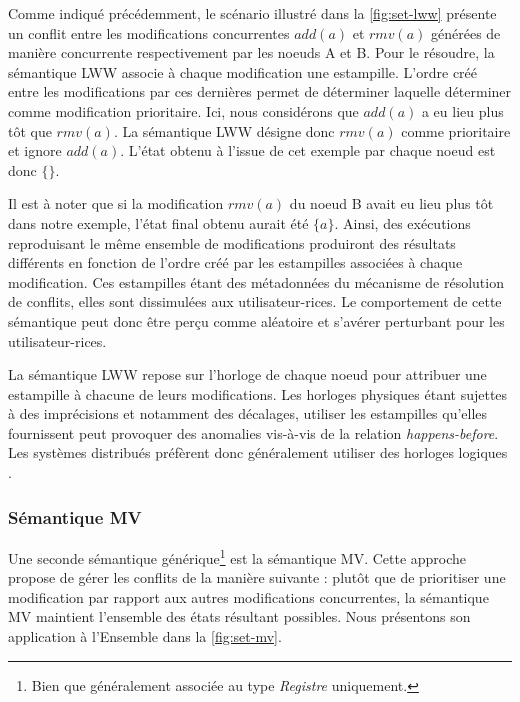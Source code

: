 \documentclass[12pt]{thesul}
\newcommand{\hb}{\emph{happens-before}}
\newcommand{\trm}[1]{\mathit{#1}}
\begin{document}
Comme indiqué précédemment, le scénario illustré dans la \autoref{fig:set-lww} présente un conflit entre les modifications concurrentes $\trm{add}(a)$ et $\trm{rmv}(a)$ générées de manière concurrente respectivement par les noeuds A et B.
Pour le résoudre, la sémantique \ac{LWW} associe à chaque modification une estampille.
L'ordre créé entre les modifications par ces dernières permet de déterminer laquelle déterminer comme modification prioritaire.
Ici, nous considérons que $\trm{add}(a)$ a eu lieu plus tôt que $\trm{rmv}(a)$.
La sémantique \ac{LWW} désigne donc $\trm{rmv}(a)$ comme prioritaire et ignore $\trm{add}(a)$.
L'état obtenu à l'issue de cet exemple par chaque noeud est donc $\{\}$.

Il est à noter que si la modification $\trm{rmv}(a)$ du noeud B avait eu lieu plus tôt dans notre exemple, l'état final obtenu aurait été $\{a\}$.
Ainsi, des exécutions reproduisant le même ensemble de modifications produiront des résultats différents en fonction de l'ordre créé par les estampilles associées à chaque modification.
Ces estampilles étant des métadonnées du mécanisme de résolution de conflits, elles sont dissimulées aux utilisateur-rices.
Le comportement de cette sémantique peut donc être perçu comme aléatoire et s'avérer perturbant pour les utilisateur-rices.

La sémantique \ac{LWW} repose sur l'horloge de chaque noeud pour attribuer une estampille à chacune de leurs modifications.
Les horloges physiques étant sujettes à des imprécisions et notamment des décalages, utiliser les estampilles qu'elles fournissent peut provoquer des anomalies vis-à-vis de la relation \hb.
Les systèmes distribués préfèrent donc généralement utiliser des horloges logiques \cite{1978-happen-before-lamport}.

\subsubsection{Sémantique \acl{MV}}

Une seconde sémantique générique\footnote{Bien que généralement associée au type \emph{Registre} uniquement.} est la sémantique \acf{MV}.
Cette approche propose de gérer les conflits de la manière suivante : plutôt que de prioritiser une modification par rapport aux autres modifications concurrentes, la sémantique \ac{MV} maintient l'ensemble des états résultant possibles.
Nous présentons son application à l'Ensemble dans la \autoref{fig:set-mv}.
\end{document}
